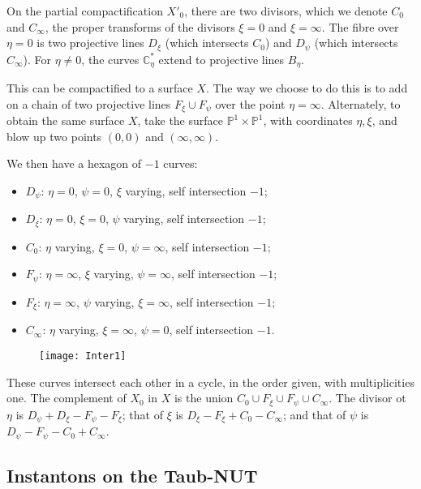 \documentclass[12pt]{article}
\theoremstyle{definition}
\theoremstyle{remark}
\numberwithin{theorem}{section}
\def\bC{{\mathbb {C}}}
\def\bP{{\mathbb {P}}}
\begin{document}
On the partial compactification $X'_0$, there are two divisors, which we  denote
$C_0$ and $C_\infty$, the proper transforms of the divisors $\xi =0$ and $\xi =\infty$. The fibre over $\eta = 0$ is two  projective lines  $D_\xi$ (which intersects $C_0$)  and $D_\psi$ (which intersects $C_\infty$).  For $\eta\neq 0$, the curves $\bC^*_\eta$ extend to projective lines $B_\eta$.

This can be compactified to a surface $X$. The way we choose to do this is to  add on a chain of two projective lines $F_\xi\cup F_\psi$ over the point $\eta =\infty.$ Alternately, to obtain the same surface $X$, take the surface $\bP^1\times \bP^1$, with coordinates $\eta, \xi$, and blow up two points  $(0,0)$ and $(\infty,\infty)$.


We then have a hexagon of $-1$ curves: 
\begin{itemize}
\item $D_\psi$: $\eta =0$, $\psi = 0$, $\xi$ varying, self intersection $-1$;
\item $D_\xi$: $\eta =0$, $\xi = 0$, $\psi$ varying, self intersection $-1$;
\item $C_0$: $\eta$ varying, $\xi = 0$, $\psi = \infty$, self intersection $-1$;
\item $F_\psi$: $\eta= \infty$, $\xi$ varying, $\psi =\infty$, self intersection $-1$;
\item $F_\xi$: $\eta= \infty$, $\psi$ varying, $\xi =\infty$, self intersection $-1$;
\item $C_\infty$: $\eta$ varying, $\xi = \infty$, $\psi=0$, self intersection $-1$.
\end{itemize}
%
\begin{figure}[htb]
\begin{center}
    \texttt{[image: Inter1]}
\label{Inter}
\end{center}
\end{figure}
%
These curves intersect each other in a cycle, in the order given, with multiplicities one. The complement of $X_0$ in $X$ is the union
$C_0\cup F_\xi  \cup F_\psi \cup C_\infty$. The divisor ot $\eta$ is $D_\psi+D_\xi - F_\psi-F_\xi$; that of $\xi$ is $D_\xi-F_\xi+C_0-C_\infty$; and that of $\psi$ is $D_\psi-F_\psi-C_0+C_\infty$. 



\subsection{Instantons on the Taub-NUT}\label{Sec:ITN}
\end{document}
